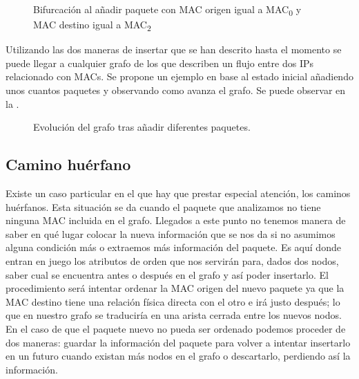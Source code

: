 \documentclass[twoside, 12pt]{epstfg}
\begin{document}
\begin{figure}
\centering

\caption[Ejemplo de bifurcación 2]{Bifurcación al añadir paquete con MAC origen igual a MAC\textsubscript{0} y MAC destino igual a MAC\textsubscript{2}}
\label{fig:Analisis:Bifurcation2}
\end{figure}

Utilizando las dos maneras de insertar que se han descrito hasta el momento se puede llegar a cualquier grafo de los que describen un flujo entre dos IPs relacionado con MACs. Se propone un ejemplo en base al estado inicial añadiendo unos cuantos paquetes y observando como avanza el grafo. Se puede observar en la .%

\begin{figure}
\centering

\caption[Ejemplo de superflujo compuesto]{Evolución del grafo tras añadir diferentes paquetes.}
\label{fig:Analisis:ComplexFlow}
\end{figure}

\newpage
\subsection{Camino huérfano}
\label{subsec:Analisis:Reconstruccion:Huerfano}

Existe un caso particular en el que hay que prestar especial atención, los caminos huérfanos. Esta situación se da cuando el paquete que analizamos no tiene ninguna MAC incluida en el grafo. Llegados a este punto no tenemos manera de saber en qué lugar colocar la nueva información que se nos da si no asumimos alguna condición más o extraemos más información del paquete. Es aquí donde entran en juego los atributos de orden que nos servirán para, dados dos nodos, saber cual se encuentra antes o después en el grafo y así poder insertarlo. El procedimiento será intentar ordenar la MAC origen del nuevo paquete ya que la MAC destino tiene una relación física directa con el otro e irá justo después; lo que en nuestro grafo se traduciría en una arista cerrada entre los nuevos nodos. En el caso de que el paquete nuevo no pueda ser ordenado podemos proceder de dos maneras: guardar la información del paquete para volver a intentar insertarlo en un futuro cuando existan más nodos en el grafo o descartarlo, perdiendo así la información.
\end{document}
